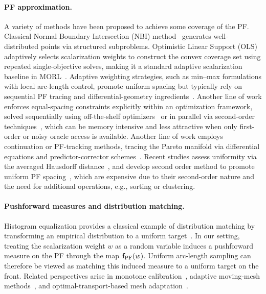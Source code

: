 \documentclass{article}
\begin{document}
\paragraph{PF approximation.}
A variety of methods have been proposed to achieve some coverage of the PF. Classical Normal Boundary Intersection (NBI) method~\citep{das1998normal} generates well-distributed points via structured subproblems. Optimistic Linear Support (OLS) adaptively selects scalarization weights to construct the convex coverage set using repeated single-objective solves, making it a standard adaptive scalarization baseline in MORL~\citep{barrett2008learning,alegre2022optimistic}. Adaptive weighting strategies, such as min–max formulations with local arc-length control, promote uniform spacing but typically rely on sequential PF tracing and differential-geometry ingredients~\citep{zhang2006minmax}. Another line of work enforces equal-spacing constraints explicitly within an optimization framework, solved sequentially using off-the-shelf optimizers~\citep{gill2006snopt} or in parallel via second-order techniques~\citep{pereyra1999asynchronous,pereyra2009fast,pereyra2013equispaced}, which can be memory intensive and less attractive when only first-order or noisy oracle access is available. 
Another line of work employs continuation or PF-tracking methods, tracing the Pareto manifold via differential equations and predictor-corrector schemes~\citep{lovison2011singular,martin2016continuation,vieira2012multicriteria,bolten2021tracing}. Recent studies assess uniformity via the averaged Hausdorff distance~\citep{bogoya2019averaged}, and develop second order method to promote uniform PF spacing~\citep{wang2024newton,zhang2024gliding}, which are expensive due to their second-order nature and the need for additional operations, e.g., sorting or clustering.

\paragraph{Pushforward measures and distribution matching.}
Histogram equalization provides a classical example of distribution matching by transforming an empirical distribution to a uniform target~\citep{gonzalez2009digital,billingsley2017probability}. In our setting, treating the scalarization weight $w$ as a random variable induces a pushforward measure on the PF through the map $\mathbf{f}_{\rm PF}(w)$. Uniform arc-length sampling can therefore be viewed as matching this induced measure to a uniform target on the front. Related perspectives arise in monotone calibration~\citep{zadrozny2002transforming}, adaptive moving-mesh methods~\citep{huang2010adaptive,xu2011convergence}, and optimal-transport-based mesh adaptation~\citep{budd2009moving,weller2016mesh}.
\end{document}
